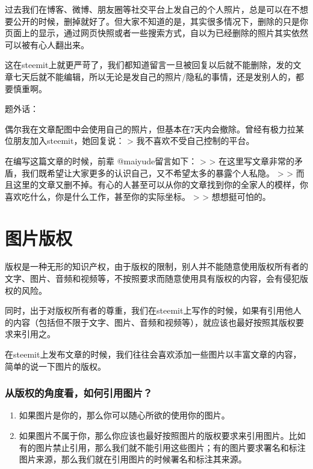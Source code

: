 \documentclass[]{ctexbook}
\begin{document}
过去我们在博客、微博、朋友圈等社交平台上发自己的个人照片，总是可以在不想要公开的时候，删掉就好了。但大家不知道的是，其实很多情况下，删除的只是你页面上的显示，通过网页快照或者一些搜索方式，自以为已经删除的照片其实依然可以被有心人翻出来。

这在steemit上就更严苛了，我们都知道留言一旦被回复以后就不能删除，发的文章七天后就不能编辑，所以无论是发自己的照片/隐私的事情，还是发别人的，都要慎重啊。

题外话：

偶尔我在文章配图中会使用自己的照片，但基本在7天内会撤除。曾经有极力拉某位朋友加入steemit，她回复说：
\textgreater{} 我不喜欢不受自己控制的平台。

在编写这篇文章的时候，前辈 @maiyude留言如下：
\textgreater{}
\textgreater{} 在这里写文章非常的矛盾，我们既希望让大家更多的认识自己，又不希望太多的暴露个人私隐。
\textgreater{}
\textgreater{} 而且这里的文章又删不掉。有心的人甚至可以从你的文章找到你的全家人的模样，你喜欢吃什么，你是什么工作，甚至你的实际坐标。
\textgreater{}
\textgreater{} 想想挺可怕的。

\hypertarget{tpbq}{%
\section{图片版权}\label{tpbq}}

版权是一种无形的知识产权，由于版权的限制，别人并不能随意使用版权所有者的文字、图片、音频和视频等，不按照要求而随意使用具有版权的内容，会有侵犯版权的风险。

同时，出于对版权所有者的尊重，我们在steemit上写作的时候，如果有引用他人的内容（包括但不限于文字、图片、音频和视频等），就应该也最好按照其版权要求来引用之。

在steemit上发布文章的时候，我们往往会喜欢添加一些图片以丰富文章的内容，简单的说一下图片的版权。

\subsubsection{从版权的角度看，如何引用图片？}

\begin{enumerate}
\def\labelenumi{\arabic{enumi}.}
\item
  如果图片是你的，那么你可以随心所欲的使用你的图片。
\item
  如果图片不属于你，那么你应该也最好按照图片的版权要求来引用图片。比如有的图片禁止引用，那么我们就不能引用这些图片；有的图片要求署名和标注图片来源，那么我们就在引用图片的时候署名和标注其来源。
\end{enumerate}
\end{document}
